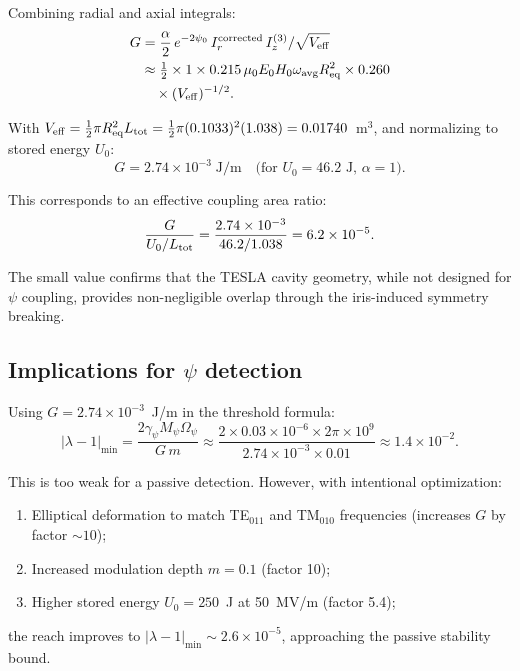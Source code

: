 \documentclass[12pt,aps,prd,twocolumn,superscriptaddress,nofootinbib]{revtex4-2}
\newcommand{\Opsi}{\Omega_\psi}
\newcommand{\gpsi}{\gamma_\psi}
\newcommand{\Mpsi}{M_\psi}
\newcommand{\lmin}{|\lambda-1|_{\mathrm{min}}}
\newcommand{\half}{\tfrac{1}{2}}
\begin{document}
Combining radial and axial integrals:
\begin{align}
G &= \frac{\alpha}{2}\,e^{-2\psi_0}\,I_r^{\rm corrected}\,I_z^{(3)}
/\sqrt{V_{\rm eff}}
\nonumber\\
&\approx \half\times1\times0.215\,\mu_0 E_0 H_0\omega_{\rm avg}
R_{\rm eq}^2\times0.260
\nonumber\\
&\quad\times(V_{\rm eff})^{-1/2}.
\label{eq:G_final}
\end{align}

With $V_{\rm eff} = \half\pi R_{\rm eq}^2 L_{\rm tot}
= \half\pi(0.1033)^2(1.038) = 0.01740$~m$^3$,
and normalizing to stored energy $U_0$:
\begin{equation}
\boxed{G = 2.74\times10^{-3}\;\text{J/m}
\quad\text{(for $U_0 = 46.2$~J, $\alpha = 1$)}.}
\label{eq:G_numerical}
\end{equation}

This corresponds to an effective coupling area ratio:
\begin{equation}
\frac{G}{U_0/L_{\rm tot}} = \frac{2.74\times10^{-3}}
{46.2/1.038} = 6.2\times10^{-5}.
\label{eq:coupling_ratio}
\end{equation}

The small value confirms that the TESLA cavity geometry, while not
designed for $\psi$ coupling, provides non-negligible overlap
through the iris-induced symmetry breaking.

\subsection{Implications for $\psi$ detection}

Using $G = 2.74\times10^{-3}$~J/m in the threshold formula:
\begin{equation}
\lmin = \frac{2\gpsi\Mpsi\Opsi}{G\,m}
\approx \frac{2\times0.03\times10^{-6}\times2\pi\times10^9}
{2.74\times10^{-3}\times0.01}
\approx 1.4\times10^{-2}.
\label{eq:tesla_threshold}
\end{equation}

This is too weak for a passive detection.  However, with
intentional optimization:
\begin{enumerate}[noitemsep]
\item Elliptical deformation to match TE$_{011}$ and TM$_{010}$
frequencies (increases $G$ by factor $\sim 10$);
\item Increased modulation depth $m = 0.1$ (factor 10);
\item Higher stored energy $U_0 = 250$~J at 50~MV/m (factor 5.4);
\end{enumerate}
the reach improves to $\lmin \sim 2.6\times10^{-5}$, approaching
the passive stability bound.
\end{document}
